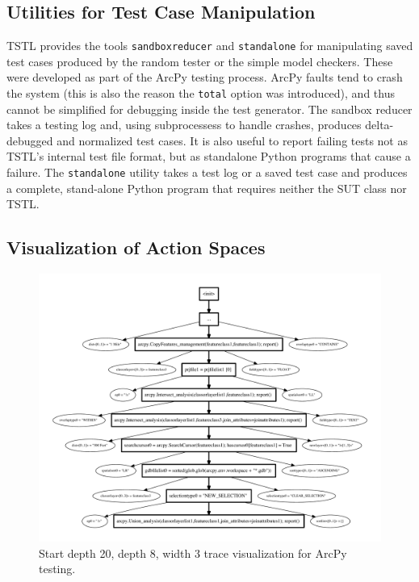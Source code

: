 \subsection{Utilities for Test Case Manipulation}

TSTL provides the tools {\tt sandboxreducer} and {\tt standalone} for manipulating saved test cases produced by the random tester or the simple model checkers.  These were developed as part of the ArcPy testing process.  ArcPy faults tend to crash the system (this is also the reason the {\tt total} option was introduced), and thus cannot be simplified for debugging inside the test generator.   The sandbox reducer takes a testing log and, using subprocessess to handle crashes, produces delta-debugged and normalized test cases. It is also useful to report failing tests not as TSTL's internal test file format, but as standalone Python programs that cause a failure.  The {\tt standalone} utility takes a test log or a saved test case and produces a complete, stand-alone Python program that requires neither the SUT class nor TSTL.

\subsection{Visualization of Action Spaces}

\begin{figure}
\includegraphics[width=\columnwidth]{shortgraph}
\caption{Start depth 20, depth 8, width 3 trace visualization for ArcPy testing.}
\label{fig:actions}
\end{figure}

